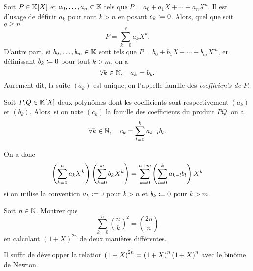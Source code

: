 \documentclass{magnolia}
\begin{document}
\begin{remarqueUnique}
\remarque Soit $P\in\polyK$ et $a_0,\ldots,a_n\in\mathbb{K}$ tels que
  $P=a_0+a_1 X+\cdots+a_n X^n$.
  Il est d'usage de définir $a_k$ pour tout $k>n$ en posant $a_k\coloneqq 0$.
  Alors, quel que soit $q\geq n$
  \[P=\sum_{k=0}^q a_kX^k.\]
  D'autre part, si $b_0,\ldots,b_m\in\mathbb{K}$ sont tels que
  $P=b_0+b_1X+\cdots+b_m X^m$, en définissant $b_k\coloneqq 0$
  pour tout $k>m$, on a 
  \[\forall k\in\mathbb{N},\quad a_k=b_k.\]
  Aurement dit, la suite $(a_k)$ est unique; on l'appelle famille des
  \emph{coefficients de $P$}.
\end{remarqueUnique}

\begin{proposition}[nom={Produit de Cauchy}]
Soit $P,Q\in\polyK$ deux polynômes dont les coefficients sont respectivement
$(a_k)$ et $(b_k)$. Alors, si on note $(c_k)$ la famille des coefficients du
produit $PQ$, on a
\[\forall k\in\mathbb{N},\quad c_k=\sum_{l=0}^k a_{k-l} b_l.\]
\end{proposition}

\begin{remarqueUnique}
\remarque On a donc
  \[\left(\sum_{k=0}^n a_k X^k\right)\left(\sum_{k=0}^m b_k X^k\right)=
    \sum_{k=0}^{n+m} \left(\sum_{l=0}^k a_{k-l} b_l\right)X^k\]
  si on utilise la convention $a_k\coloneqq 0$ pour $k>n$ et $b_k\coloneqq 0$
  pour $k>m$.
\end{remarqueUnique}

\begin{exoUnique}
\exo Soit $n\in\mathbb{N}$. Montrer que
  \[\sum_{k=0}^{n} \binom{n}{k}^2=\binom{2n}{n}\]
  en calculant $(1+X)^{2n}$ de deux manières différentes.
  \begin{sol}
  Il suffit de développer la relation $\left(1+X\right)^{2n}=\left(1+X\right)^n\left(1+X\right)^n$ avec
  le binôme de Newton.
    \end{sol}
  
\end{exoUnique}
\end{document}
